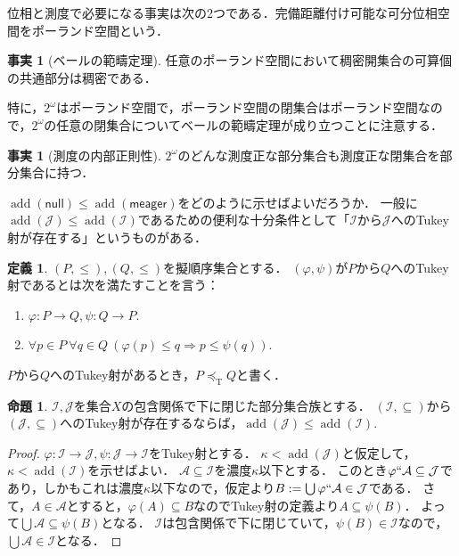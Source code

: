 \documentclass[uplatex,dvipdfmx]{jsarticle}
\newcommand{\scrI}{\mathcal{I}}
\newcommand{\scrJ}{\mathcal{J}}
\newcommand{\tukeyle}{\preceq_\mathrm{T}}
\newcommand{\add}{\operatorname{add}}
\newcommand{\nul}{\mathsf{null}}
\newcommand{\meager}{\mathsf{meager}}
\renewcommand\subset{\subseteq}
\theoremstyle{definition}
\newtheorem{defi}[thm]{定義}
\newtheorem{fact}[thm]{事実}
\newtheorem{prop}[thm]{命題}
\theoremstyle{named}
\begin{document}
	位相と測度で必要になる事実は次の2つである．完備距離付け可能な可分位相空間をポーランド空間という．
	
	\begin{fact}[ベールの範疇定理]
		任意のポーランド空間において稠密開集合の可算個の共通部分は稠密である．
	\end{fact}

	特に，$2^\omega$はポーランド空間で，ポーランド空間の閉集合はポーランド空間なので，$2^\omega$の任意の閉集合についてベールの範疇定理が成り立つことに注意する．
	
	\begin{fact}[測度の内部正則性]
		$2^\omega$のどんな測度正な部分集合も測度正な閉集合を部分集合に持つ．
	\end{fact}
	
	$\add(\nul) \le \add(\meager)$をどのように示せばよいだろうか．
	一般に$\add(\scrJ) \le \add(\scrI)$であるための便利な十分条件として「$\scrI$から$\scrJ$へのTukey射が存在する」というものがある．
	
	\begin{defi}
		$(P, \le), (Q, \le)$を擬順序集合とする．
		$(\varphi, \psi)$が$P$から$Q$へのTukey射であるとは次を満たすことを言う：
		\begin{enumerate}
			\item $\varphi: P \to Q, \psi: Q \to P$.
			\item $\forall p \in P\ \forall q \in Q\ (\varphi(p) \le q \Rightarrow p \le \psi(q))$.
		\end{enumerate}
		$P$から$Q$へのTukey射があるとき，$P \tukeyle Q$と書く．
	\end{defi}

	\begin{prop}
		$\scrI, \scrJ$を集合$X$の包含関係で下に閉じた部分集合族とする．
		$(\scrI, \subset)$から$(\scrJ, \subset)$へのTukey射が存在するならば，$\add(\scrJ) \le \add(\scrI)$.
	\end{prop}
	\begin{proof}
		$\varphi : \scrI \to \scrJ, \psi : \scrJ \to \scrI$をTukey射とする．
		$\kappa < \add(\scrJ)$と仮定して，$\kappa < \add(\scrI)$を示せばよい．
		$\mathcal{A} \subset \scrI$を濃度$\kappa$以下とする．
		このとき$\varphi``\mathcal{A} \subset \scrJ$であり，しかもこれは濃度$\kappa$以下なので，仮定より$B := \bigcup \varphi``\mathcal{A} \in \scrJ$である．
		さて，$A \in \mathcal{A}$とすると，$\varphi(A) \subset B$なのでTukey射の定義より$A \subset \psi(B)$．
		よって$\bigcup \mathcal{A} \subset \psi(B)$となる．
		$\scrI$は包含関係で下に閉じていて，$\psi(B) \in \scrI$なので，$\bigcup \mathcal{A} \in \scrI$となる．
	\end{proof}
\end{document}
